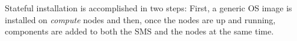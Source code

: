 Stateful  installation is accomplished in two steps: First,  a generic OS
image is installed on {\em compute} nodes and then, once the nodes are up
and running, \OHPC{} components are added to both the SMS and the nodes at the
same time.